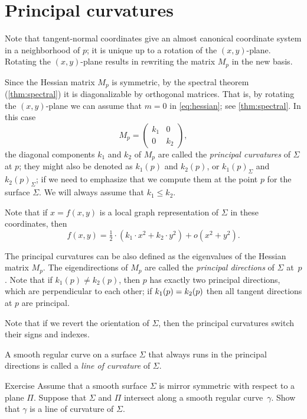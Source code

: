 \section{Principal curvatures}

Note that tangent-normal coordinates give an almost canonical coordinate system in a neighborhood of $p$;
it is unique up to a rotation of  the $(x,y)$-plane.
Rotating the $(x,y)$-plane results in rewriting   
the matrix $M_p$ in the new basis.

Since the Hessian matrix $M_p$ is symmetric, by the spectral theorem (\ref{thm:spectral}) it is diagonalizable by orthogonal matrices.
That is, by rotating the $(x,y)$-plane we can assume that $m=0$ in \ref{eq:hessian}; see \ref{thm:spectral}.
In this case
\[M_p=\begin{pmatrix}
   k_1
   &0
   \\
   0
   &k_2
  \end{pmatrix},
\]
the diagonal components $k_1$ and $k_2$ of $M_p$ are called the \emph{principal curvatures} of $\Sigma$ at $p$;
they might also be denoted as $k_1(p)$ and $k_2(p)$, or $k_1(p)_\Sigma$ and $k_2(p)_\Sigma$;
if we need to emphasize that we compute them at the point $p$ for the surface $\Sigma$.
We will always assume that $k_1\le k_2$.


Note that if $x=f(x,y)$ is a local graph representation of $\Sigma$ in these coordinates, then 
\[f(x,y)=\tfrac12\cdot(k_1\cdot x^2+k_2\cdot y^2)+o(x^2+y^2).\]

The principal curvatures can be also defined as the eigenvalues of the Hessian matrix $M_p$.
The eigendirections of $M_p$  are called the \emph{principal directions} of $\Sigma$ at~$p$.
Note that if $k_1(p)\ne k_2(p)$, then $p$ has exactly two principal directions, which are perpendicular to each other; if $k_1(p)\z= k_2(p)$ then all tangent directions at $p$ are principal.

Note that if we revert the orientation of $\Sigma$, then the principal curvatures switch their signs and indexes.

A smooth regular curve on a surface $\Sigma$ that always runs in the principal directions is called a \emph{line of curvature} of $\Sigma$.  

\begin{thm}{Exercise}\label{ex:line-of-curvature}
Assume that a smooth surface $\Sigma$ is mirror symmetric with respect to  a plane $\Pi$.
Suppose that $\Sigma$ and $\Pi$ intersect along a smooth regular curve~$\gamma$.
Show that $\gamma$ is a line of curvature of $\Sigma$.
\end{thm}

